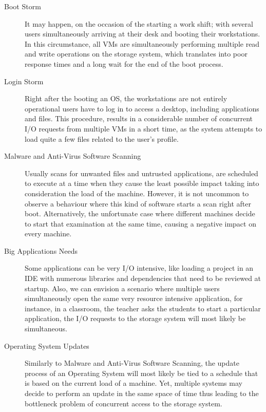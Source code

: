 \begin{description}
	\item [Boot Storm] It may happen, on the occasion of the starting a work shift; with several users simultaneously arriving at their desk and booting their workstations. In this circumstance, all VMs are simultaneously performing multiple read and write operations on the storage system, which translates into poor response times and a long wait for the end of the boot process.
	\item [Login Storm] Right after the booting an OS, the workstations are not entirely operational users have to log in to access a desktop, including applications and files. This procedure, results in a considerable number of concurrent I/O requests from multiple VMs in a short time, as the system attempts to load quite a few files related to the user's profile.
	\item [Malware and Anti-Virus Software Scanning] Usually scans for unwanted files and untrusted applications, are scheduled to execute at a time when they cause the least possible impact taking into consideration the load of the machine. However, it is not uncommon to observe a behaviour where this kind of software starts a scan right after boot. Alternatively, the unfortunate case where different machines decide to start that examination at the same time, causing a negative impact on every machine.
	\item [Big Applications Needs] Some applications can be very I/O intensive, like loading a project in an IDE with numerous libraries and dependencies that need to be reviewed at startup. Also, we can envision a scenario where multiple users simultaneously open the same very resource intensive application, for instance, in a classroom, the teacher asks the students to start a particular application, the I/O requests to the storage system will most likely be simultaneous.
	\item [Operating System Updates] Similarly to Malware and Anti-Virus Software Scanning, the update process of an Operating System will most likely be tied to a schedule that is based on the current load of a machine. Yet, multiple systems may decide to perform an update in the same space of time thus leading to the bottleneck problem of concurrent access to the storage system.
\end{description}

	 
	 


